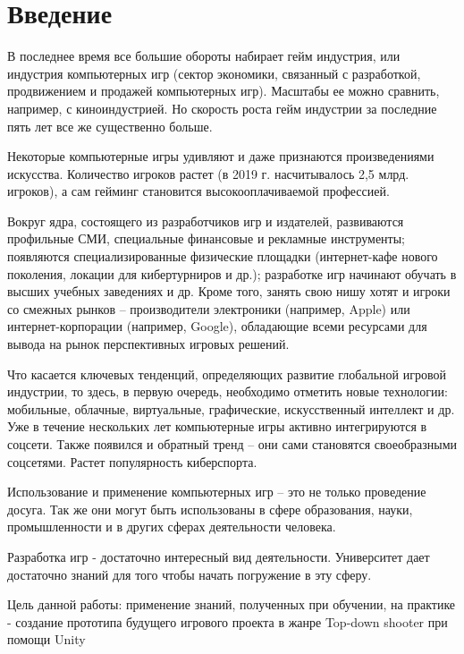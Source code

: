 \documentclass[14pt, titlepage,fleqn,a4paper]{extarticle}
\begin{document}
	\tableofcontents   
	\setcounter{page}{1}
	\newpage
	\section*{Введение}


В последнее время все большие обороты набирает гейм индустрия, или индустрия компьютерных игр (сектор экономики, связанный с разработкой, продвижением и продажей компьютерных игр). Масштабы ее можно сравнить, например, с киноиндустрией. Но скорость роста гейм индустрии за последние пять лет все же существенно больше.

Некоторые компьютерные игры удивляют и даже признаются произведениями искусства. Количество игроков растет (в 2019 г. насчитывалось 2,5 млрд. игроков), а сам гейминг становится высокооплачиваемой профессией. 

Вокруг ядра, состоящего из разработчиков игр и издателей, развиваются профильные СМИ, специальные финансовые и рекламные инструменты; появляются специализированные физические площадки (интернет-кафе нового поколения, локации для кибертурниров и др.); разработке игр начинают обучать в высших учебных заведениях и др. Кроме того, занять свою нишу хотят и игроки со смежных рынков – производители электроники (например, Apple) или интернет-корпорации (например, Google), обладающие всеми ресурсами для вывода на рынок перспективных игровых решений.

Что касается ключевых тенденций, определяющих развитие глобальной игровой индустрии, то здесь, в первую очередь, необходимо отметить новые технологии: мобильные, облачные, виртуальные, графические, искусственный интеллект и др. Уже в течение нескольких лет компьютерные игры активно интегрируются в соцсети. Также появился и обратный тренд – они сами становятся своеобразными соцсетями. Растет популярность киберспорта.

Использование и применение компьютерных игр – это не только проведение досуга. Так же они могут быть использованы в сфере образования, науки, промышленности и в других сферах деятельности человека. 

Разработка игр - достаточно интересный вид деятельности. Университет дает достаточно знаний для того чтобы начать погружение в эту сферу.

Цель данной работы: применение знаний, полученных при обучении, на практике - создание прототипа будущего игрового проекта в жанре Top-down shooter при помощи Unity
\end{document}
